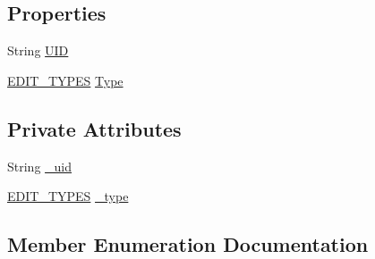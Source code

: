 \subsection*{Properties}
\begin{DoxyCompactItemize}
\item 
String \hyperlink{class_web_analyzer_1_1_events_1_1_edit_participant_event_acef746eb86f5262d48b583822b20cfcc}{U\+I\+D}
\item 
\hyperlink{class_web_analyzer_1_1_events_1_1_edit_participant_event_a72647511d8ac40197121e93d14913a1a}{E\+D\+I\+T\+\_\+\+T\+Y\+P\+E\+S} \hyperlink{class_web_analyzer_1_1_events_1_1_edit_participant_event_a26e1781598d44a49a9512df5442eb4a6}{Type}
\end{DoxyCompactItemize}
\subsection*{Private Attributes}
\begin{DoxyCompactItemize}
\item 
String \hyperlink{class_web_analyzer_1_1_events_1_1_edit_participant_event_a83110c23b64e39448d037e55486712b4}{\+\_\+uid}
\item 
\hyperlink{class_web_analyzer_1_1_events_1_1_edit_participant_event_a72647511d8ac40197121e93d14913a1a}{E\+D\+I\+T\+\_\+\+T\+Y\+P\+E\+S} \hyperlink{class_web_analyzer_1_1_events_1_1_edit_participant_event_abe6fa80e6542cba6fbd7483ecffd154f}{\+\_\+type}
\end{DoxyCompactItemize}


\subsection{Member Enumeration Documentation}
\hypertarget{class_web_analyzer_1_1_events_1_1_edit_participant_event_a72647511d8ac40197121e93d14913a1a}{}

